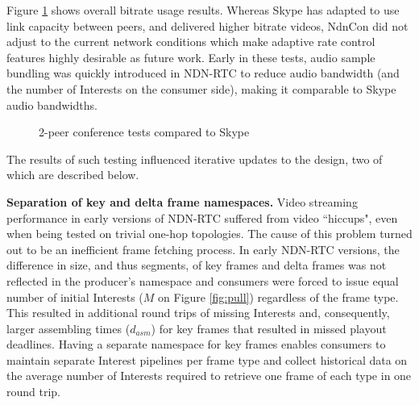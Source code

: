 \documentclass{icn/sig-alternate-2013} %
\newcommand{\ndnrtcName}{NDN-RTC} %
\begin{document}
Figure \ref{fig:tests-skype} shows overall bitrate usage results. Whereas Skype has adapted to use link capacity between peers, and delivered higher bitrate videos, NdnCon did not adjust to the current network conditions which make adaptive rate control features highly desirable as future work. Early in these tests, audio sample bundling was quickly introduced in \ndnrtcName{} to reduce audio bandwidth (and the number of Interests on the consumer side), making it comparable to Skype audio bandwidths.

%

\begin{figure}[t!]
\centering
\begin{scriptsize}
\def\svgwidth{0.53\textwidth}
\end{scriptsize}
\vspace{-18pt}
\caption{2-peer conference tests compared to Skype}
\label{fig:tests-skype}
\end{figure}


The results of such testing influenced iterative updates to the design, two of which are described below. 

\textbf{Separation of key and delta frame namespaces.} Video streaming performance in early versions of \ndnrtcName{} suffered from video ``hiccups", even when being tested on trivial one-hop topologies. The cause of this problem turned out to be an inefficient frame fetching process.
 In early \ndnrtcName{} versions, the difference in size, and thus segments, of key frames and delta frames was not reflected in the producer's namespace and consumers were forced to issue equal number of initial Interests ($M$ on Figure \ref{fig:pull}) regardless of the frame type. This resulted in additional round trips of missing Interests and, consequently, larger assembling times ($d_{asm}$) for key frames that resulted in missed playout deadlines. Having a separate namespace for key frames enables consumers to maintain separate Interest pipelines per frame type and collect historical data on the average number of Interests required to retrieve one frame of each type in one round trip. 
\end{document}
